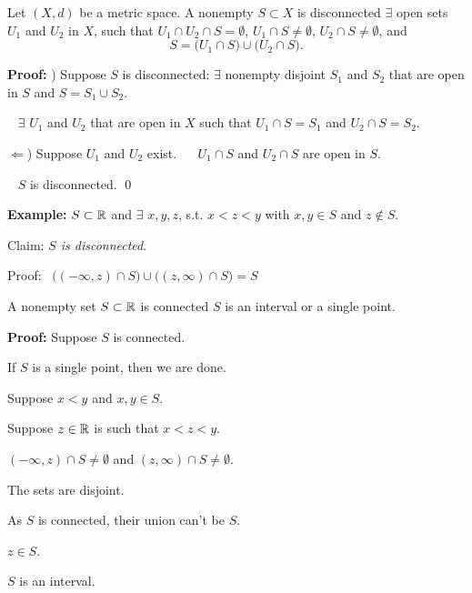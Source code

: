 \documentclass[10pt,aspectratio=149]{beamer}
\begin{document}
\begin{frame}

\begin{proposition}
Let $(X,d)$ be a metric space.
\pause
A nonempty $S \subset X$ is disconnected \wiffif
$\exists$ open sets $U_1$ and
$U_2$ in $X$, such that $U_1 \cap U_2 \cap S = \emptyset$,
$U_1 \cap S \not= \emptyset$,
$U_2 \cap S \not= \emptyset$, and
\vspace*{-6pt}
\begin{equation*}
S = 
\bigl( U_1 \cap S \bigr)
\cup
\bigl( U_2 \cap S \bigr) .
\end{equation*}
\end{proposition}

\pause
\begin{center}
\end{center}

\pause
\textbf{Proof:}
\thus)
Suppose $S$ is disconnected:
\pause
$\exists$
nonempty disjoint $S_1$ and $S_2$ that are
open in $S$ and $S = S_1 \cup S_2$.

\pause
\thus~ $\exists$ $U_1$ and $U_2$
that are open in $X$ such that $U_1 \cap S = S_1$ and
$U_2 \cap S = S_2$.

\pause
$\Leftarrow$)
Suppose $U_1$ and $U_2$ exist.
\pause
~\thus~ $U_1 \cap S$ and $U_2 \cap S$ are open in $S$.

\pause
\thus~ $S$ is disconnected.
\qed

\pause
\medskip

\textbf{Example:}
$S \subset {\mathbb{R}}$ and $\exists$ $x,y,z$, s.t.  $x < z < y$ with $x,y \in S$
and $z \notin S$.

\pause
Claim: \emph{$S$ is disconnected}.

\pause
Proof:
~$
\bigl( (-\infty,z) \cap S \bigr)
\cup
\bigl( (z,\infty) \cap S \bigr)
= S$

\end{frame}

\begin{frame}

\begin{proposition}
A nonempty set $S \subset {\mathbb{R}}$ is connected \wiffif $S$ is
an interval or a single point.
\end{proposition}

\pause
\textbf{Proof:}
Suppose $S$ is connected.

\pause
\medskip

If $S$ is a single point, then we are done.

\pause
\medskip

Suppose $x < y$ and $x,y \in S$.

\pause
Suppose $z \in {\mathbb{R}}$ is such that $x < z < y$.

\pause
$(-\infty,z) \cap S \not= \emptyset$ and $(z,\infty) \cap S \not=
\emptyset$.

\pause
The sets are disjoint.

\pause
As $S$ is connected, their union can't be $S$.

\pause
\thus \quad $z \in S$.

\pause
\thus \quad $S$ is an interval.

\end{frame}
\end{document}
